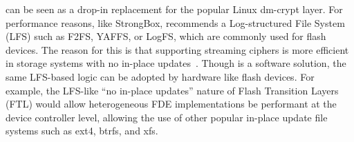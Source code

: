  \sys can be seen as a drop-in replacement for the popular
Linux dm-crypt layer. For performance reasons, like StrongBox, \sys recommends a
Log-structured File System (LFS) such as F2FS, YAFFS, or LogFS, which are
commonly used for flash devices. The reason for this is that supporting
streaming ciphers is more efficient in storage systems with no in-place
updates~\cite{StrongBox}. Though \sys is a software solution, the same LFS-based
logic can be adopted by hardware like flash devices. For example, the LFS-like
``no in-place updates'' nature of Flash Transition Layers (FTL) would allow
heterogeneous FDE implementations be performant at the device controller level,
allowing the use of other popular in-place update file systems such as ext4,
btrfs, and xfs.
